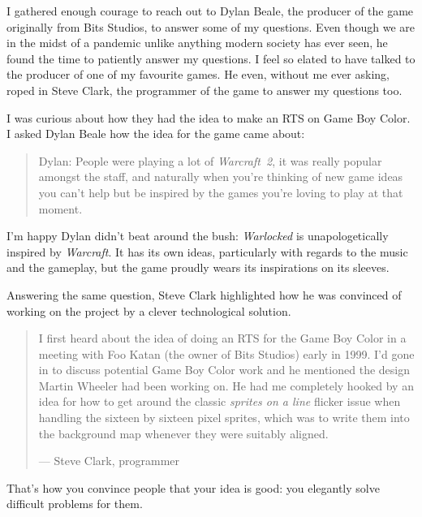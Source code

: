 \documentclass{book}
\begin{document}
I gathered enough courage to reach out to Dylan Beale, the producer of the game originally from Bits Studios, to answer some of my questions. Even though we are in the midst of a pandemic unlike anything modern society has ever seen, he found the time to patiently answer my questions. I feel so elated to have talked to the producer of one of my favourite games. He even, without me ever asking, roped in Steve Clark, the programmer of the game to answer my questions too.

I was curious about how they had the idea to make an RTS on Game Boy Color. I asked Dylan Beale how the idea for the game came about:

\begin{quote}
Dylan: People were playing a lot of \emph{Warcraft 2}, it was really popular amongst the staff, and naturally when you’re thinking of new game ideas you can’t help but be inspired by the games you’re loving to play at that moment.
\end{quote} \par

I’m happy Dylan didn’t beat around the bush: \emph{Warlocked} is unapologetically inspired by \emph{Warcraft}. It has its own ideas, particularly with regards to the music and the gameplay, but the game proudly wears its inspirations on its sleeves.

Answering the same question, Steve Clark highlighted how he was convinced of working on the project by a clever technological solution.

\begin{quote}
I first heard about the idea of doing an RTS for the Game Boy Color in a meeting with Foo Katan (the owner of Bits Studios) early in 1999. I’d gone in to discuss potential Game Boy Color work and he mentioned the design Martin Wheeler had been working on. He had me completely hooked by an idea for how to get around the classic \emph{sprites on a line} flicker issue when handling the sixteen by sixteen pixel sprites, which was to write them into the background map whenever they were suitably aligned.

— Steve Clark, programmer
\end{quote} \par

That’s how you convince people that your idea is good: you elegantly solve difficult problems for them.
\end{document}

